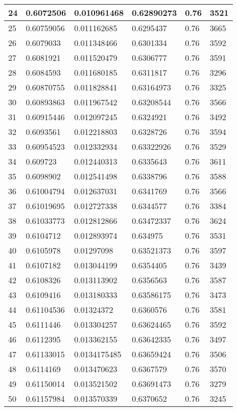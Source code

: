 \begin{longtable}{|l|l|l|l|l|l|}
24 & 0.6072506 & 0.010961468 & 0.62890273 & 0.76 & 3521 \\ \hline 
25 & 0.60759056 & 0.011162685 & 0.6295437 & 0.76 & 3665 \\ \hline 
26 & 0.6079033 & 0.011348466 & 0.6301334 & 0.76 & 3592 \\ \hline 
27 & 0.6081921 & 0.011520479 & 0.6306777 & 0.76 & 3591 \\ \hline 
28 & 0.6084593 & 0.011680185 & 0.6311817 & 0.76 & 3296 \\ \hline 
29 & 0.60870755 & 0.011828841 & 0.63164973 & 0.76 & 3325 \\ \hline 
30 & 0.60893863 & 0.011967542 & 0.63208544 & 0.76 & 3566 \\ \hline 
31 & 0.60915446 & 0.012097245 & 0.6324921 & 0.76 & 3492 \\ \hline 
32 & 0.6093561 & 0.012218803 & 0.6328726 & 0.76 & 3594 \\ \hline 
33 & 0.60954523 & 0.012332934 & 0.63322926 & 0.76 & 3529 \\ \hline 
34 & 0.609723 & 0.012440313 & 0.6335643 & 0.76 & 3611 \\ \hline 
35 & 0.6098902 & 0.012541498 & 0.6338796 & 0.76 & 3588 \\ \hline 
36 & 0.61004794 & 0.012637031 & 0.6341769 & 0.76 & 3566 \\ \hline 
37 & 0.61019695 & 0.012727338 & 0.6344577 & 0.76 & 3384 \\ \hline 
38 & 0.61033773 & 0.012812866 & 0.63472337 & 0.76 & 3624 \\ \hline 
39 & 0.6104712 & 0.012893974 & 0.634975 & 0.76 & 3531 \\ \hline 
40 & 0.6105978 & 0.01297098 & 0.63521373 & 0.76 & 3597 \\ \hline 
41 & 0.6107182 & 0.013044199 & 0.6354405 & 0.76 & 3439 \\ \hline 
42 & 0.6108326 & 0.013113902 & 0.6356563 & 0.76 & 3587 \\ \hline 
43 & 0.6109416 & 0.013180333 & 0.63586175 & 0.76 & 3473 \\ \hline 
44 & 0.61104536 & 0.01324372 & 0.6360576 & 0.76 & 3581 \\ \hline 
45 & 0.6111446 & 0.013304257 & 0.63624465 & 0.76 & 3592 \\ \hline 
46 & 0.6112395 & 0.013362155 & 0.63642335 & 0.76 & 3497 \\ \hline 
47 & 0.61133015 & 0.0134175485 & 0.63659424 & 0.76 & 3506 \\ \hline 
48 & 0.6114169 & 0.013470623 & 0.6367579 & 0.76 & 3570 \\ \hline 
49 & 0.61150014 & 0.013521502 & 0.63691473 & 0.76 & 3279 \\ \hline 
50 & 0.61157984 & 0.013570339 & 0.6370652 & 0.76 & 3245 \\ \hline 
\end{longtable}